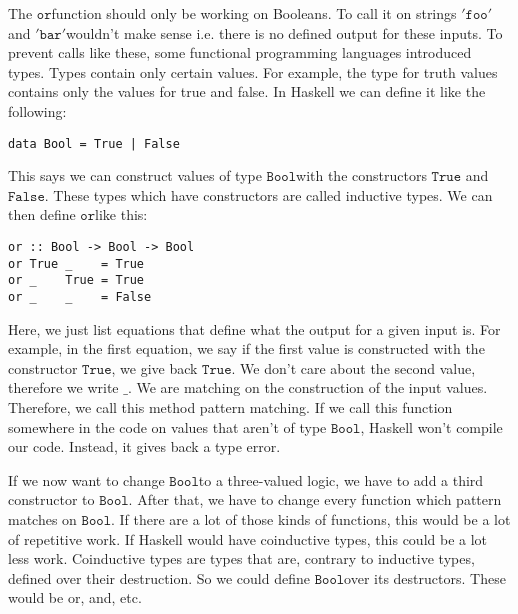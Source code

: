 \documentclass[a4paper,cleardoubleempty,BCOR1cm]{scrbook}
\begin{document}
The $\mathtt{or}$\;function should only be working on Booleans. To call it on strings
$\mathtt{'foo'}$\;and $\mathtt{'bar'}$\;wouldn't make sense i.e. there is no defined output for
these inputs. To prevent calls like these, some functional programming
languages introduced types. Types contain only certain values. For example, the
type for truth values contains only the values for true and false. In Haskell
we can define it like the following:
\begin{verbatim}
data Bool = True | False
\end{verbatim}
This says we can construct values of type $\mathtt{Bool}$\;with the constructors $\mathtt{True}$
and $\mathtt{False}$. These types which have constructors are called inductive types. We can
then define $\mathtt{or}$\;like this:
\begin{verbatim}
or :: Bool -> Bool -> Bool
or True _    = True
or _    True = True
or _    _    = False
\end{verbatim}
Here, we just list equations that define what the output for a given input is.
For example, in the first equation, we say if the first value is constructed
with the constructor $\mathtt{True}$, we give back $\mathtt{True}$.  We don't care about the
second value, therefore we write $\mathtt{\_}$.  We are matching on the construction of
the input values.  Therefore, we call this method pattern matching.
If we call this function somewhere in the code on values that aren't of type
$\mathtt{Bool}$,  Haskell won't compile our code.  Instead, it gives back a type error.

If we now want to change $\mathtt{Bool}$\;to a three-valued logic, we have to add a
third constructor to $\mathtt{Bool}$. After that, we have to change every function which
pattern matches on $\mathtt{Bool}$. If there are a lot of those kinds of functions,
this would be a lot of repetitive work. If Haskell would have coinductive types,
this could be a lot less work. Coinductive types are types that are,
contrary to inductive types, defined over their destruction. So we could define
$\mathtt{Bool}$\;over its destructors. These would be or, and, etc.
\end{document}
